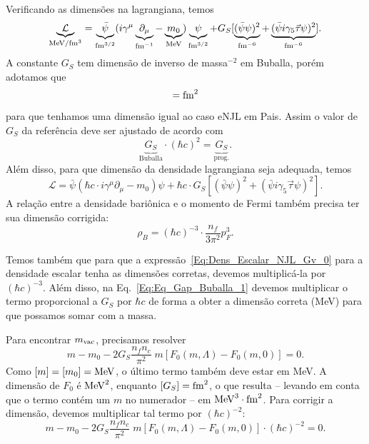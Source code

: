 \begin{enumerate}
Verificando as dimensões na lagrangiana, temos
\begin{equation}
	\underbrace{\mathcal{L}}_{\mathcal{\rm{MeV}/\rm{fm}^3}} = \underbrace{\bar{\psi}}_{\rm{fm}^{3/2}}(i\gamma^\mu\underbrace{\partial_\mu}_{\rm{fm}^{-1}} - \underbrace{m_0}_{\rm{MeV}})\underbrace{\psi}_{\rm{fm}^{3/2}} + G_S [ \underbrace{(\bar{\psi}\psi)^2}_{\rm{fm}^{-6}} + \underbrace{(\bar{\psi}i\gamma_5\vec{\tau}\psi)^2}_{\rm{fm}^{-6}}].
\end{equation}
%
A constante $G_S$ tem dimensão de inverso de massa$^{-2}$ em Buballa\cite{Buballa1996}, porém adotamos que 
\begin{equation}
	[G_S] = \rm{fm}^{2}
\end{equation}
%
para que tenhamos uma dimensão igual ao caso eNJL em Pais\cite{Pais}. Assim o valor de $G_S$ da referência deve ser ajustado de acordo com
\begin{equation}
	\underbrace{G_S}_{\textrm{Buballa}} \cdot (\hbar c)^2 = \underbrace{G_S}_{\textrm{prog.}}.
\end{equation}
%
Além disso, para que dimensão da densidade lagrangiana seja adequada, temos
\begin{equation}
	\mathcal{L} = \bar{\psi}(\hbar c \cdot i\gamma^\mu\partial_\mu - m_0)\psi + \hbar c \cdot G_S[(\bar{\psi}\psi)^2 + (\bar{\psi}i\gamma_5\vec{\tau}\psi)^2].
\end{equation}
%
A relação entre a densidade bariônica e o momento de Fermi também precisa ter sua dimensão corrigida:
\begin{equation}
	\rho_B = (\hbar c)^{-3} \cdot \frac{n_f}{3\pi^2}p_F^3.
\end{equation}

Temos também que para que a expressão~\eqref{Eq:Dens_Escalar_NJL_Gv_0} para a densidade escalar tenha as dimensões corretas, devemos multiplicá-la por $(\hbar c)^{-3}$. Além disso, na Eq.~\eqref{Eq:Eq_Gap_Buballa_1} devemos multiplicar o termo proporcional a $G_S$ por $\hbar c$ de forma a obter a dimensão correta (MeV) para que possamos somar com a massa.

Para encontrar $m_{\rm{vac}}$, precisamos resolver
\begin{equation}
	m - m_0 - 2G_S\frac{n_f n_c}{\pi^2} \;m [F_0(m, \Lambda) - F_0(m,0)] = 0.
\end{equation}
%
Como $[m] = [m_0] = \rm{MeV}$, o último termo também deve estar em MeV. A dimensão de $F_0$ é $\rm{MeV}^2$, enquanto $[G_S] = \rm{fm}^2$, o que resulta -- levando em conta que o termo contém um $m$ no numerador -- em $\rm{MeV}^3\cdot\rm{fm}^2$. Para corrigir a dimensão, devemos multiplicar tal termo por $(\hbar c)^{-2}$:
\begin{equation}
	m - m_0 - 2G_S\frac{n_f n_c}{\pi^2} \;m [F_0(m, \Lambda) - F_0(m,0)] \cdot (\hbar c)^{-2} = 0.
\end{equation}


\end{enumerate}
